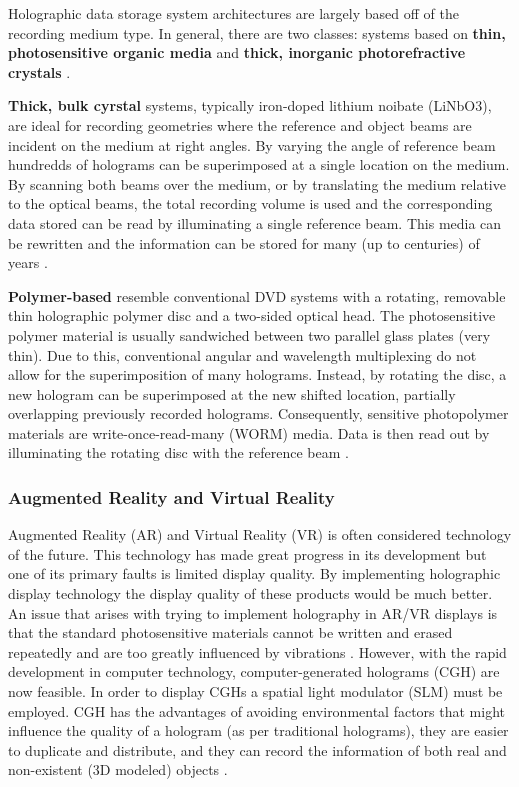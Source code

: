 \documentclass[12pt]{article}
\begin{document}
Holographic data storage system architectures are largely based off of the recording medium type. In general, there are two classes: systems based on \textbf{thin, photosensitive organic media} and \textbf{thick, inorganic photorefractive crystals} \cite{hesselink2004holographic}.

\textbf{Thick, bulk cyrstal} systems, typically iron-doped lithium noibate (LiNbO3), are ideal for recording geometries where the reference and object beams are incident on the medium at right angles. By varying the angle of reference beam hundredds of holograms can be superimposed at a single location on the medium. By scanning both beams over the medium, or by
translating the medium relative to the optical beams, the total recording volume is used and the corresponding data stored can be read by illuminating a single reference beam. This media can be rewritten and the information can be stored for many (up to centuries) of years \cite{hesselink2004holographic}.

\textbf{Polymer-based} resemble conventional DVD systems with a rotating, removable thin holographic polymer disc and a two-sided optical head. The photosensitive polymer material is usually sandwiched between two parallel glass plates (very thin). Due to this, conventional angular and wavelength multiplexing do not allow for the superimposition of many holograms.
Instead, by rotating the disc, a new hologram can be superimposed at the new shifted location, partially overlapping previously recorded holograms. Consequently, sensitive photopolymer materials are write-once-read-many (WORM) media. Data is then read out by illuminating the rotating disc with the reference beam \cite{hesselink2004holographic}.

\subsubsection{Augmented Reality and Virtual Reality}

Augmented Reality (AR) and Virtual Reality (VR) is often considered technology of the future. This technology has made great progress in its development but one of its primary faults is limited display quality. By implementing holographic display technology the display quality of these products would be much better.
An issue that arises with trying to implement holography in AR/VR displays is that the standard photosensitive materials cannot be written and erased repeatedly and are too greatly influenced by vibrations \cite{he2019progress}.
However, with the rapid development in computer technology, computer-generated holograms (CGH) are now feasible. In order to display CGHs a spatial light modulator (SLM) must be employed. CGH has the advantages of avoiding environmental factors that might influence the quality of a hologram (as per traditional holograms),
they are easier to duplicate and distribute, and they can record the information of both real and non-existent (3D modeled) objects \cite{he2019progress}.
\end{document}
